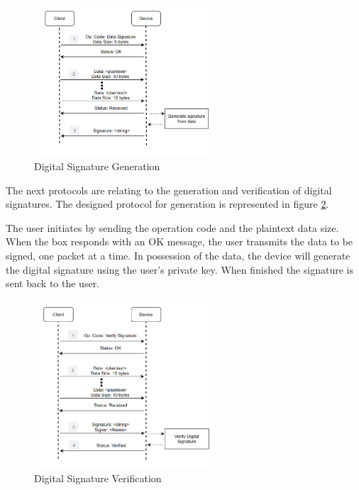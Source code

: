 \begin{figure}[h]
	\centering
	\includegraphics[width=0.6\textwidth]{./Images/signature-generate.png}
	\caption{Digital Signature Generation}
	\label{fig:protocol:signature-generate}
\end{figure}

The next protocols are relating to the generation and verification of digital signatures.
The designed protocol for generation is represented in figure \ref{fig:protocol:signature-verify}.

The user initiates by sending the operation code and the plaintext data size.
When the box responds with an OK message, the user transmits the data to be signed, one packet at a time.
In possession of the data, the device will generate the digital signature using the user's private key. When finished the signature is sent back to the user.

\begin{figure}[h]
	\centering
	\includegraphics[width=0.6\textwidth]{./Images/signature-verify.png}
	\caption{Digital Signature Verification}
	\label{fig:protocol:signature-verify}
\end{figure}

